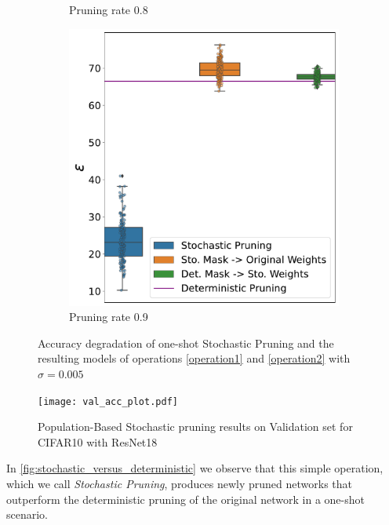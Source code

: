 \begin{figure}[!htb]
\begin{subfigure}[b]{0.65\columnwidth}
    \caption{Pruning rate 0.8} 
    \label{fig:pr0.8sigma0.005}
     \end{subfigure}
    \hfill
     \begin{subfigure}[b]{0.65\columnwidth}
         \centering
     \includegraphics[width=\columnwidth]{figures/epsilon_allN_all_pr_0.9_sigma=0.005.pdf}
    \caption{Pruning rate 0.9} 
    \label{fig:pr0.9sigma0.005}
     \end{subfigure}
     \caption{Accuracy degradation of one-shot Stochastic Pruning and the resulting models of operations \ref{operation1} and \ref{operation2} with $\sigma=0.005$}
     \label{fig:sigma0.005}
\end{figure}


\begin{figure}[htpb]
    \centering
    \texttt{[image: val\_acc\_plot.pdf]}
    \caption{Population-Based Stochastic pruning results on Validation set for
    CIFAR10 with ResNet18 }
    \label{fig:ValidationAccuracy}
\end{figure}


In \cref{fig:stochastic_versus_deterministic} we observe that this simple operation, which we call \textit{Stochastic Pruning}, produces newly pruned networks that outperform the deterministic pruning of the original network in a one-shot scenario. 


